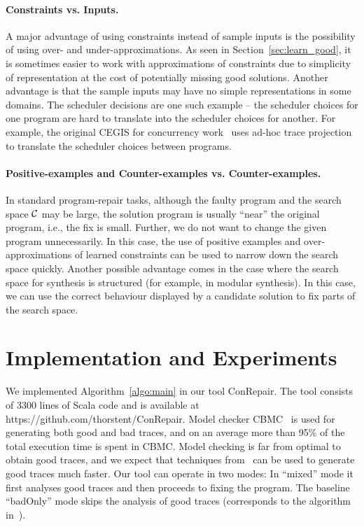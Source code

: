 \documentclass{llncs}
\begin{document}
\vspace{-1ex}
\paragraph{Constraints vs. Inputs.}
A major advantage of using constraints instead of sample inputs is the
possibility of using over- and under-approximations.
As seen in Section~\ref{sec:learn_good}, it is sometimes easier
to work with approximations of constraints due to simplicity
of representation at the cost of potentially missing good solutions.
Another advantage is that the sample inputs may have no simple
representations in some domains. 
The scheduler decisions are one such example -- the
scheduler choices for one program are hard to translate into the
scheduler choices for another.
For example, the original CEGIS for concurrency work~\cite{SLJB08} uses 
ad-hoc trace projection to translate the scheduler choices
between programs.


\vspace{-1ex}
\paragraph{Positive-examples and Counter-examples vs. Counter-examples.}
In standard program-repair tasks, although the faulty
program and the search space $\mathcal{C}$ may be large, the
solution program is usually ``near'' the original program, i.e., the fix
is small.
Further, we do not want to change the given program unnecessarily. 
In this case, the use of positive examples and over-approximations of
learned constraints can be used to narrow down the search space quickly.
Another possible advantage comes in the case where the search space
for synthesis is structured (for example, in modular synthesis).
In this case, we can use the correct behaviour displayed by a candidate
solution to fix parts of the search space.


\section{Implementation and Experiments}
\label{sec:impl}

We implemented Algorithm~\ref{algo:main} in our tool ConRepair.
The tool consists of 3300 lines of Scala code and is available at
https://github.com/thorstent/ConRepair.
Model checker CBMC~\cite{cbmc} is used for generating both good and bad
traces, and on an average more than 95\% of the total execution time is
spent in CBMC.
Model checking is far from optimal to obtain good traces, and we expect
that techniques from~\cite{Sen:2008:RDR:1375581.1375584} can be used to
generate good traces much faster.
Our tool can operate in two modes: In ``mixed'' mode it first
analyses good traces and then proceeds to fixing the program. 
The baseline ``badOnly'' mode skips the analysis of good traces
(corresponds to the algorithm in~\cite{cav2013}).
\end{document}
